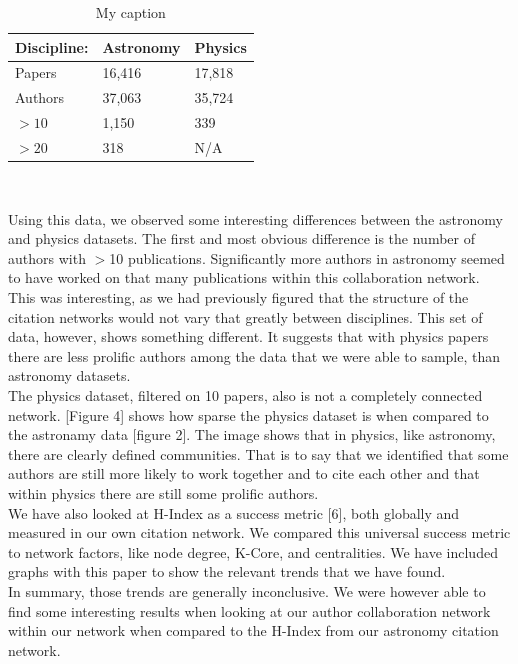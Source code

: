 \documentclass[times, 10pt,twocolumn]{article}
\begin{document}
\begin{table}[h]
\centering
\caption{My caption}
\label{my-label}
    \begin{tabular}{ | l | l | l |}
    \hline
    Discipline: & Astronomy & Physics \\ \hline
    Papers & 16,416 & 17,818  \\ \hline
    Authors & 37,063 & 35,724 \\ \hline
    $> 10$ & 1,150 & 339 \\ \hline
    $> 20$ & 318 & N/A \\ \hline
    \end{tabular}\\
\end{table}

Using this data, we observed some interesting differences between the astronomy and physics datasets. The first and most obvious difference is the number of authors with $>$10 publications. Significantly more authors in astronomy seemed to have worked on that many publications within this collaboration network. \\

This was interesting, as we had previously figured that the structure of the citation networks would not vary that greatly between disciplines. This set of data, however, shows something different. It suggests that with physics papers there are less prolific authors among the data that we were able to sample, than astronomy datasets. \\

The physics dataset, filtered on 10 papers, also is not a completely connected network. [Figure 4] shows how sparse the physics dataset is when compared to the astronamy data [figure 2]. The image shows that in physics, like astronomy, there are clearly defined communities. That is to say that we identified that some authors are still more likely to work together and to cite each other and that within physics there are still some prolific authors. \\

We have also looked at H-Index as a success metric [6], both globally and measured in our own citation network. We compared this universal success metric to network factors, like node degree, K-Core, and centralities. We have included graphs with this paper to show the relevant trends that we have found. \\

In summary, those trends are generally inconclusive. We were however able to find some interesting results when looking at our author collaboration network within our network when compared to the H-Index from our astronomy citation network. \\
\end{document}
